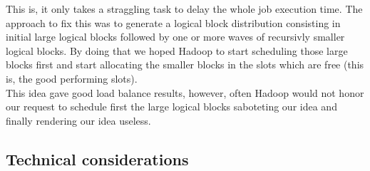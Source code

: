 This is, it only takes a straggling task to delay the whole job execution time. The approach to fix this was to generate a logical block distribution consisting in initial large logical blocks followed by one or more waves of recursivly smaller logical blocks. By doing that we hoped Hadoop to start scheduling those large blocks first and start allocating the smaller blocks in the slots which are free (this is, the good performing slots). \\
This idea gave good load balance results, however, often Hadoop would not honor our request to schedule first the large logical blocks saboteting our idea and finally rendering our idea useless.

\subsection{Technical considerations}
\lipsum[10]
